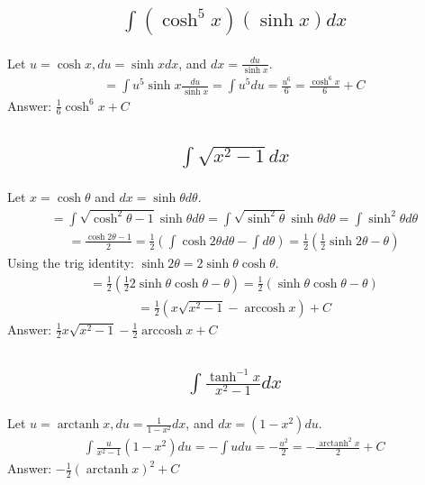 \documentclass{article}
\DeclareMathOperator{\arccosh}{arccosh}
\DeclareMathOperator{\arctanh}{arctanh}
\begin{document}
\subsection{
	\begin{align*}
		\int{(\cosh^5 x) (\sinh x) dx}
	\end{align*}
}
Let $u = \cosh{x}, du = \sinh{x}dx$, and $dx = \frac{du}{\sinh{x}}$. 
\begin{align*}
	= \int{u^5 \sinh{x} \frac{du}{\sinh{x}}} = \int{u^5 du} = \frac{u^6}{6} = \frac{\cosh^6{x}}{6} + C
\end{align*}
Answer: $\frac{1}{6} \cosh^6{x} + C$

\subsection{
	\begin{align*}
		\int{\sqrt{x^2 - 1} dx}
	\end{align*}
}
Let $x = \cosh{\theta}$ and $dx = \sinh{\theta}d\theta$. 
\begin{align*}
	= \int{\sqrt{\cosh^2{\theta} - 1}\sinh{\theta}d\theta} = \int{\sqrt{\sinh^2{\theta}}\sinh{\theta}d\theta} = \int{\sinh^2{\theta}d\theta}
\end{align*}
\begin{align*}
	= \frac{\cosh{2\theta} - 1}{2} = \frac{1}{2} \left( \int{\cosh{2\theta}d\theta} - \int{d\theta} \right) = \frac{1}{2} \left( \frac{1}{2}\sinh{2\theta} - \theta \right)
\end{align*}
Using the trig identity: $\sinh{2\theta} = 2\sinh{\theta}\cosh{\theta}$. 
\begin{align*}
	= \frac{1}{2} \left( \frac{1}{2}2\sinh{\theta}\cosh{\theta} - \theta \right) = \frac{1}{2} \left( \sinh{\theta}\cosh{\theta} - \theta \right)
\end{align*}
\begin{align*}
	= \frac{1}{2} \left( x\sqrt{x^2 - 1} - \arccosh{x} \right) + C
\end{align*}
Answer: $\frac{1}{2}x \sqrt{x^2 - 1} - \frac{1}{2} \arccosh{x} + C$

\subsection{
	\begin{align*}
		\int{\frac{\tanh^{-1} x}{x^2 - 1} dx}
	\end{align*}
}
Let $u = \arctanh{x}, du = \frac{1}{1 - x^2}dx$, and $dx = (1 - x^2)du$. 
\begin{align*}
	\int{\frac{u}{x^2 - 1}(1 - x^2)du} = -\int{udu} = -\frac{u^2}{2} = -\frac{\arctanh^2{x}}{2} + C
\end{align*}
Answer: $-\frac{1}{2} (\arctanh{x})^2 + C$
\end{document}
